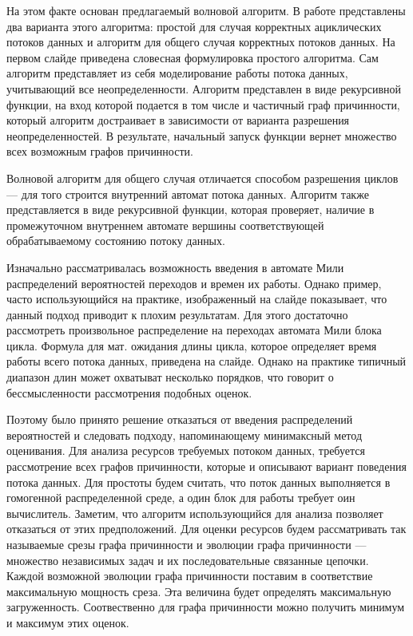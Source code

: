 \documentclass[10pt,a4paper,onecolumn]{report}
\begin{document}
  На этом факте основан предлагаемый волновой алгоритм.
  В работе представлены два варианта этого алгоритма: простой для случая корректных ациклических потоков данных и алгоритм для общего случая корректных потоков данных.
  На первом слайде приведена словесная формулировка простого алгоритма. Сам алгоритм представляет из себя моделирование работы потока данных,
  учитывающий все неопределенности. Алгоритм представлен в виде рекурсивной функции, на вход которой подается в том числе и частичный граф причинности, который
  алгоритм достраивает в зависимости от варианта разрешения неопределенностей. В результате, начальный запуск функции вернет множество всех возможным графов причинности.
  
  Волновой алгоритм для общего случая отличается способом разрешения циклов --- для того строится внутренний автомат потока данных. Алгоритм также представляется в виде
  рекурсивной функции, которая проверяет, наличие в промежуточном внутреннем автомате вершины соответствующей обрабатываемому состоянию потоку данных.
  
  Изначально рассматривалась возможность введения в автомате Мили распределений вероятностей переходов и времен их работы.
  Однако пример, часто использующийся на практике, изображенный на слайде показывает, что данный подход приводит к плохим результатам. Для этого достаточно рассмотреть
  произвольное распределение на переходах автомата Мили блока цикла. Формула для мат. ожидания длины цикла, которое определяет время работы всего потока данных,
  приведена на слайде. Однако на практике типичный диапазон длин может охватыват несколько порядков, что говорит о бессмысленности рассмотрения подобных оценок.
  
  Поэтому было принято решение отказаться от введения распределений вероятностей и следовать подходу, напоминающему минимаксный метод оценивания.
  Для анализа ресурсов требуемых потоком данных, требуется рассмотрение всех графов причинности, которые и описывают вариант поведения потока данных.
  Для простоты будем считать, что поток данных выполняется в гомогенной распределенной среде, а один блок для работы требует оин вычислитель.
  Заметим, что алгоритм использующийся для анализа позволяет отказаться от этих предположений.
  Для оценки ресурсов будем рассматривать так называемые срезы графа причинности и эволюции графа причинности --- множество независимых задач и их
  последовательные связанные цепочки.
  Каждой возможной эволюции графа причинности поставим в соответствие максимальную мощность среза. Эта величина будет определять максимальную загруженность.
  Соотвественно для графа причинности можно получить минимум и максимум этих оценок.
  
\end{document}
